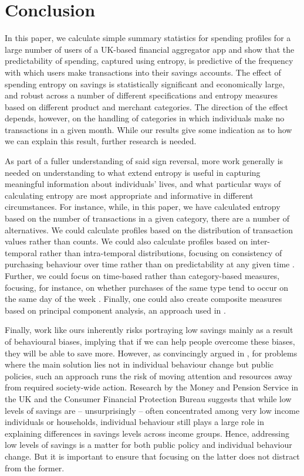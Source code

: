
\section{Conclusion}
\label{sec:conclusion}

In this paper, we calculate simple summary statistics for spending profiles for
a large number of users of a UK-based financial aggregator app and show that
the predictability of spending, captured using entropy, is predictive of the
frequency with which users make transactions into their savings accounts. The
effect of spending entropy on savings is statistically significant and
economically large, and robust across a number of different specifications and
entropy measures based on different product and merchant categories. The
direction of the effect depends, however, on the handling of categories in
which individuals make no transactions in a given month. While our results give
some indication as to how we can explain this result, further research is
needed.

As part of a fuller understanding of said sign reversal, more work generally is
needed on understanding to what extend entropy is useful in capturing
meaningful information about individuals' lives, and what particular ways of
calculating entropy are most appropriate and informative in different
circumstances. For instance, while, in this paper, we have calculated entropy
based on the number of transactions in a given category, there are a number of
alternatives. We could calculate profiles based on the distribution of
transaction values rather than counts. We could also calculate profiles based
on inter-temporal rather than intra-temporal distributions, focusing on
consistency of purchasing behaviour over time rather than on predictability at
any given time \citep{krumme2013predictability}. Further, we could focus on
time-based rather than category-based measures, focusing, for instance, on
whether purchases of the same type tend to occur on the same day of the week
\citep{guidotti2015behavioral}. Finally, one could also create composite
measures based on principal component analysis, an approach used in
\citet{eagle2010network}.

Finally, work like ours inherently risks portraying low savings mainly as a
result of behavioural biases, implying that if we can help people overcome these
biases, they will be able to save more. However, as convincingly argued in
\citet{chater2022frame}, for problems where the main solution lies not in
individual behaviour change but public policies, such an approach runs the risk
of moving attention and resources away from required society-wide action.
Research by the Money and Pension Service in the UK \citep{mps2018building} and
the Consumer Financial Protection Bureau \citep{cfpb2017financial} suggests
that while low levels of savings are -- unsurprisingly -- often concentrated
among very low income individuals or households, individual behaviour still
plays a large role in explaining differences in savings levels across income
groups. Hence, addressing low levels of savings is a matter for both public
policy and individual behaviour change. But it is important to ensure that
focusing on the latter does not distract from the former.
